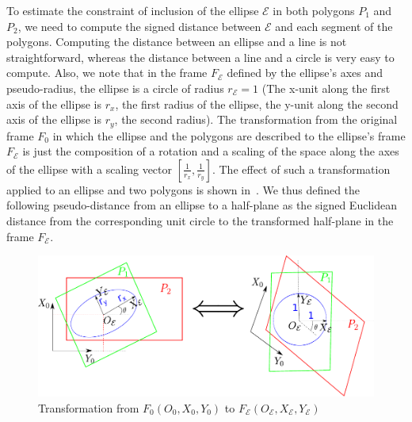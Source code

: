 To estimate the constraint of inclusion of the ellipse $\mathcal{E}$ in both polygons $P_1$ and $P_2$, we need to compute the signed distance between $\mathcal{E}$ and each segment of the polygons.
Computing the distance between an ellipse and a line is not straightforward, whereas the distance between a line and a circle is very easy to compute.
Also, we note that in the frame $F_\mathcal{E}$ defined by the ellipse's axes and pseudo-radius, the ellipse is a circle of radius $r_{\mathcal{E}}=1$ (The x-unit along the first axis of the ellipse is $r_x$, the first radius of the ellipse, the y-unit along the second axis of the ellipse is $r_y$, the second radius).
The transformation from the original frame $F_0$ in which the ellipse and the polygons are described to the ellipse's frame $F_\mathcal{E}$ is just the composition of a rotation and a scaling of the space along the axes of the ellipse with a scaling vector $[\frac{1}{r_x}, \frac{1}{r_y}]$.
The effect of such a transformation applied to an ellipse and two polygons is shown in~.
We thus defined the following pseudo-distance from an ellipse to a half-plane as the signed Euclidean distance from the corresponding unit circle to the transformed half-plane in the frame $F_\mathcal{E}$.

\begin{figure}[!htb]
  \centering
  \includegraphics[width=0.5\linewidth]{pseudo-distance.pdf}
  \caption{Transformation from $F_0(O_0, X_0, Y_0)$ to $F_\mathcal{E}(O_\mathcal{E},X_\mathcal{E},Y_\mathcal{E})$}
\label{fig:pseudo-distance}
\end{figure}

